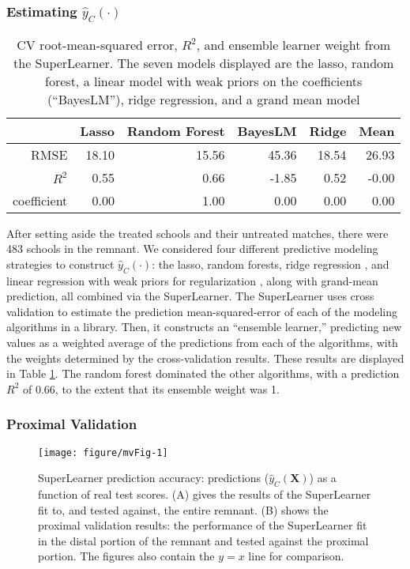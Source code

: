 \documentclass[12pt]{article}\usepackage[]{graphicx}\usepackage[]{color}
\makeatletter
\def\maxwidth{ %
  \ifdim\Gin@nat@width>\linewidth
    \linewidth
  \else
    \Gin@nat@width
  \fi
}
\newenvironment{knitrout}{}{} %
\newcommand{\algorithm}{\hat{y}_C(\cdot)}
\newcommand{\covMat}{\bm{X}}
\makeatother
\begin{document}
\subsubsection{Estimating  $\algorithm$}
\begin{table}[ht]
\centering
\begin{tabular}{rrrrrr}
  \hline
 & Lasso & Random Forest & BayesLM & Ridge & Mean \\ 
  \hline
RMSE & 18.10 & 15.56 & 45.36 & 18.54 & 26.93 \\ 
  $R^2$ & 0.55 & 0.66 & -1.85 & 0.52 & -0.00 \\ 
  coefficient & 0.00 & 1.00 & 0.00 & 0.00 & 0.00 \\ 
   \hline
\end{tabular}
\caption{CV root-mean-squared error,  $R^2$, and ensemble learner weight from the SuperLearner. The seven models displayed are the lasso, random forest, a linear model with weak priors on the coefficients (``BayesLM''), ridge regression, and a grand mean model} 
\label{cvTab}
\end{table}



After setting aside the treated schools and their untreated matches, there were 483 schools in the remnant.
We considered four different predictive modeling strategies to
construct $\algorithm$: the lasso, random forests, ridge regression
\citep{hoerl1970ridge,MASS}, and linear regression with weak priors for
regularization \citep{arm},
 along with
grand-mean prediction, all combined via the
SuperLearner.
The SuperLearner uses cross validation to estimate the prediction mean-squared-error of each of the
modeling algorithms in a library.
Then, it constructs an ``ensemble learner,'' predicting new values as
a weighted average of the predictions from each of the algorithms,
with the weights determined by the cross-validation results.
These results are displayed in Table \ref{cvTab}.
The random forest dominated the other algorithms, with a
prediction $R^2$ of 0.66, to the
extent that its ensemble weight was
1.



\subsubsection{Proximal Validation}


\begin{figure}
\begin{knitrout}
\color{fgcolor}
\texttt{[image: figure/mvFig-1]} 

\end{knitrout}
\caption{SuperLearner prediction accuracy:
predictions ($\hat{y}_C(\covMat)$) as a function of real test scores. (A) gives
the results of the SuperLearner fit to, and tested against, the entire remnant. (B) shows
the proximal validation results: the performance of the SuperLearner fit in the distal portion of the remnant and tested against the proximal portion. The figures also contain the $y=x$
line for comparison.}
\label{fig:cv}
\end{figure}
\end{document}
